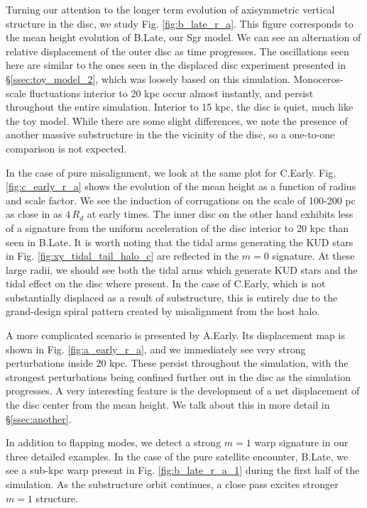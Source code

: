 Turning our attention to the longer term evolution of axisymmetric vertical structure in the disc, we study Fig. \ref{fig:b_late_r_a}. This figure corresponds to the mean height evolution of B.Late, our Sgr model. We can see an alternation of relative displacement of the outer disc as time progresses. The oscillations seen here are similar to the ones seen in the displaced disc experiment presented in \S\ref{ssec:toy_model_2}, which was loosely based on this simulation. Monoceros-scale fluctuations interior to 20 kpc occur almost instantly, and persist throughout the entire simulation. Interior to 15 kpc, the disc is quiet, much like the toy model. While there are some slight differences, we note the presence of another massive substructure in the the vicinity of the disc, so a one-to-one comparison is not expected.


In the case of pure misalignment, we look at the same plot for C.Early. Fig. \ref{fig:c_early_r_a} shows the evolution of the mean height as a function of radius and scale factor. We see the induction of corrugations on the scale of 100-200 pc as close in as $4\,R_d$ at early times. The inner disc on the other hand exhibits less of a signature from the uniform acceleration of the disc interior to 20 kpc than seen in B.Late. It is worth noting that the tidal arms generating the KUD stars in Fig. \ref{fig:xy_tidal_tail_halo_c} are reflected in the $m=0$ signature. At these large radii, we should see both the tidal arms which generate KUD stars and the tidal effect on the disc where present. In the case of C.Early, which is not substantially displaced as a result of substructure, this is entirely due to the grand-design spiral pattern created by misalignment from the host halo.

A more complicated scenario is presented by A.Early. Its displacement map is shown in Fig. \ref{fig:a_early_r_a}, and we immediately see very strong perturbations inside 20 kpc. These persist throughout the simulation, with the strongest perturbations being confined further out in the disc as the simulation progresses. A very interesting feature is the development of a net displacement of the disc center from the mean height. We talk about this in more detail in \S\ref{ssec:another}.

In addition to flapping modes, we detect a strong $m=1$ warp signature in our three detailed examples. In the case of the pure satellite encounter, B.Late, we see a sub-kpc warp present in Fig. \ref{fig:b_late_r_a_1} during the first half of the simulation. As the substructure orbit continues, a close pass excites stronger $m=1$ structure. 

